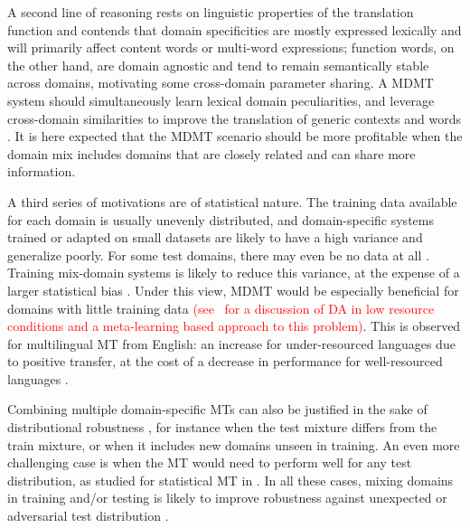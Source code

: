 \documentclass[11pt,a4paper]{article}
\newcommand{\revision}[1]{\textcolor{red}{#1}}
\begin{document}
A second line of reasoning rests on linguistic properties of the translation function and contends that domain specificities are mostly expressed lexically and will primarily affect content words or multi-word expressions; function words, on the other hand, are domain agnostic and tend to remain semantically stable across domains, motivating some cross-domain parameter sharing. A MDMT system should simultaneously learn lexical domain peculiarities, and leverage cross-domain similarities to improve the translation of generic contexts and words \cite{Zeng18multidomain,Pham19generic}. It is here expected that the MDMT scenario should be more profitable when the domain mix includes domains that are closely related and can share more information.

A third series of motivations are of statistical nature. The training data available for each domain is usually unevenly distributed, and domain-specific systems trained or adapted on small datasets are likely to have a high variance and generalize poorly. For some test domains, there may even be no data at all \cite{Farajian17neural}. Training mix-domain systems is likely to reduce this variance, at the expense of a larger statistical bias \cite{Clark12onesystem}. Under this view, MDMT would be especially beneficial for domains with little training data \revision{(see~\cite{Sharaf20metalearning} for a discussion of DA in low resource conditions and a meta-learning based approach to this problem)}. This is observed for multilingual MT from English: an increase for under-resourced languages due to positive transfer, at the cost of a decrease in performance for well-resourced languages \cite{Arivazhagan19massively}.

Combining multiple domain-specific MTs can also be justified in the sake of distributional robustness \cite{Mansour09domainadaptation,Mansour09multiple}, for instance when the test mixture differs from the train mixture, or when it includes new domains unseen in training.
An even more challenging case is when the MT would need to perform well for any test distribution, as studied for statistical MT in \cite{Huck15mixeddomain}. In all these cases, mixing domains in training and/or testing is likely to improve robustness against unexpected or adversarial test distribution \cite{Oren19distributionally}.
\end{document}
